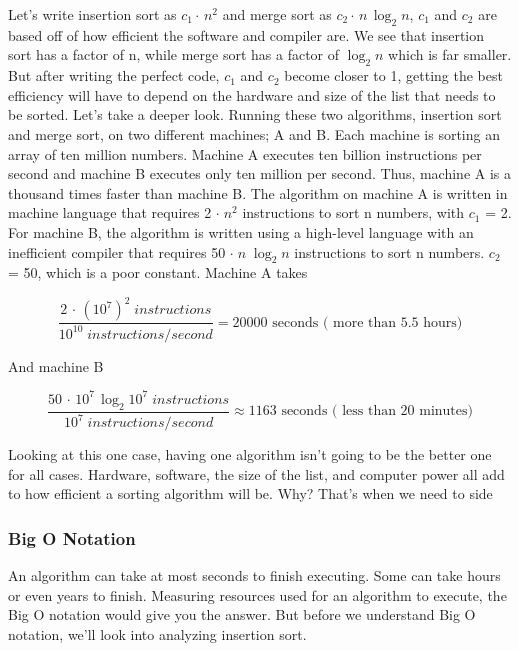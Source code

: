 \documentclass[12pt]{article}
\begin{document}
	Let’s write insertion sort as $c_1 \cdot\,n^2$ and merge sort as $c_2 \cdot\,n\,\log_2{n}$, $c_1$ and $c_2$ are based off of how efficient the software and compiler are.
	We see that insertion sort has a factor of n, while merge sort has a factor of $\log_2{n}$ which is far smaller.
	But after writing the perfect code, $c_1$ and $c_2$ become closer to 1, getting the best efficiency will have to depend on the hardware and size of the list that needs to be sorted.
	Let’s take a deeper look. Running these two algorithms, insertion sort and merge sort, on two different machines; A and B. Each machine is sorting an array of ten million numbers.
	Machine A executes ten billion instructions per second and machine B executes only ten million per second.
	Thus, machine A is a thousand times faster than machine B.
	The algorithm on machine A is written in machine language that requires 2 $\cdot\;n^2$ instructions to sort n numbers, with $c_1$ = 2.
	For machine B, the algorithm is written using a high-level language with an inefficient compiler that requires 50 $\cdot\;n\;\log_2{n}$ instructions to sort n numbers. $c_2$ = 50, which is a poor constant.
	Machine A takes
	
	$$\frac{2\,\cdot\,(10^7)^2 \;instructions}{10^{10} \;instructions/\!second}=20000\mbox{ seconds ( more than 5.5 hours)}$$
	
	And machine B
	
	$$\frac{50\,\cdot\,10^7\,\log_2{10^7}\;instructions}{10^{7} \;instructions/\!second}\approx1163\mbox{ seconds ( less than 20 minutes)}$$
	                                                                                 
	Looking at this one case, having one algorithm isn't going to be the better one for all cases. Hardware, software, the size of the list, and computer power all add to how efficient a sorting algorithm will be. Why? That's when we need to side 
	                                                                                 
	\subsubsection{Big O Notation}
	
	An algorithm can take at most seconds to finish executing.
	Some can take hours or even years to finish.
	Measuring resources used for an algorithm to execute, the Big O notation would give you the answer.
	But before we understand Big O notation, we’ll look into analyzing insertion sort.
	
\end{document}

